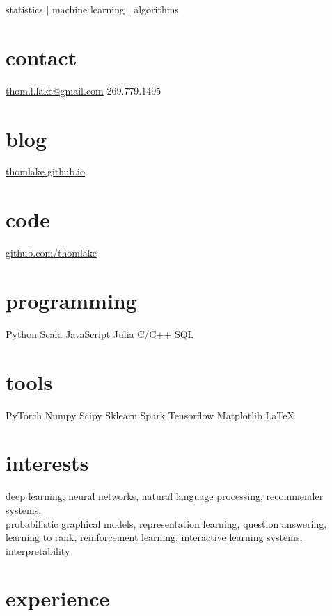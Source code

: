 \documentclass[print]{friggeri-cv}
\begin{document}
       {statistics | machine learning | algorithms}

\begin{aside}
  \section{contact}
    \href{mailto:thom.l.lake@gmail.com}{thom.l.lake@gmail.com}
    269.779.1495
  \section{blog}
    \href{https://thomlake.github.io/}{thomlake.github.io}
  \section{code}
    \href{https://github.com/thomlake}{github.com/thomlake}
  \section{programming}
    Python
    Scala
    JavaScript
    Julia
    C/C++
    SQL
  \section{tools}
    PyTorch
    Numpy
    Scipy
    Sklearn
    Spark
    Tensorflow    
    Matplotlib
    \LaTeX
\end{aside}

\section{interests}


deep learning, neural networks, natural language processing, recommender systems,\\ probabilistic graphical models, representation learning, question answering, learning to rank, reinforcement learning, interactive learning systems, interpretability

\section{experience}
\end{document}

